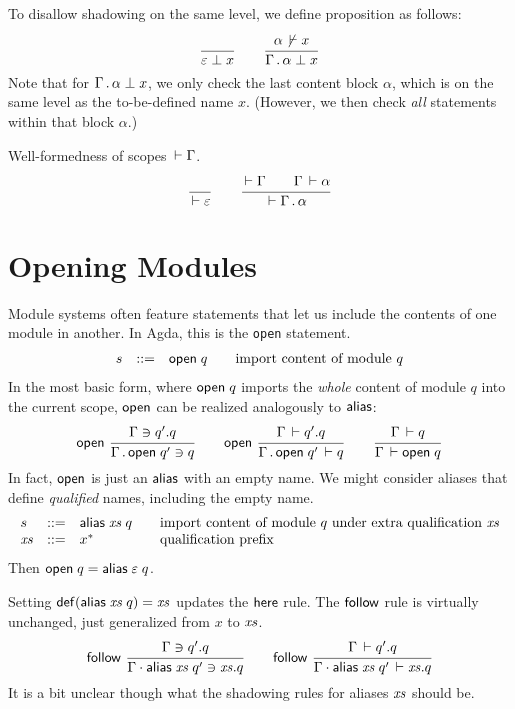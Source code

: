 \documentclass{article}
\theoremstyle{definition}
\theoremstyle{plain}
\theoremstyle{remark}
\begin{document}
To disallow shadowing on the same level, we define proposition
 as follows:
\begin{gather*}
  \ru{}{\NoClash \Ge x}
\qquad
  \ru{\NotDeclares \alpha x
    }{\NoClash {\Gamma \sep \alpha} x}
\end{gather*}
Note that for $\Gamma \,.\, \alpha \perp x$,
we only check the last content block $\alpha$,
which is on the same level as the to-be-defined name $x$.
(However, we then check \emph{all} statements within that block
$\alpha$.)

Well-formedness of scopes $\,\vdash\Gamma$.
\begin{gather*}
  \ru{}{\WScope \Ge}
\qquad
  \ru{\WScope \Gamma \qquad \WContent \Gamma \alpha
    }{\WScope {\Gamma \sep \alpha}}
\end{gather*}

\section{Opening Modules}

Module systems often feature statements that let us include the
contents of one module in another.  In Agda, this is the \texttt{open}
statement.
\[
\begin{array}{lrl@{\qquad}l}
  s & ::= & \mopen q & \mbox{import content of module $q$}
\end{array}
\]
In the most basic form, where $\mathsf{open}\;q$ imports the \emph{whole}
content of module $q$ into the current scope, $\mathsf{open}$ can be realized
analogously to $\mathsf{alias}$:
\[
  \nru{\ropen
     }{\Contains \Gamma {q'.q}
     }{\Contains {\Gamma \sep \mopen {q'}} q}
\qquad
  \nru{\ropen
     }{\Declares \Gamma {q'.q}
     }{\Declares {\Gamma \sep \mopen {q'}} q}
\qquad
  \ru{\Declares \Gamma q
    }{\WContent \Gamma {\mopen q}}
\]
In fact, $\mathsf{open}$ is just an $\mathsf{alias}$ with an empty name.
We might consider aliases that define \emph{qualified} names,
including the empty name.
\[
\begin{array}{lrl@{\qquad}l}
  s & ::= & \malias \vxs q & \mbox{import content of module $q$ under
                              extra qualification $\vxs$} \\
  \vxs & ::= & x^*         & \mbox{qualification prefix} \\
\end{array}
\]
Then $\mathsf{open}\;q = \mathsf{alias}\;\varepsilon\;q$.

Setting $\mathop{\mathsf{def}}(\mathsf{alias}\;\mathit{xs}\;q) = \mathit{xs}$ updates the $\mathsf{here}$
rule.  The $\mathsf{follow}$ rule is virtually unchanged, just generalized
from $x$ to $\mathit{xs}$.
\[
  \nru{\rfollow
     }{\Contains \Gamma {q'.q}
     }{\Contains {\Gamma \chop \malias \vxs q'} {\vxs.q}}
\qquad
  \nru{\rfollow
     }{\Declares \Gamma {q'.q}
     }{\Declares {\Gamma \chop \malias \vxs q'} {\vxs.q}}
\]
It is a bit unclear though what the shadowing rules for aliases $\mathit{xs}$
should be.
\end{document}

